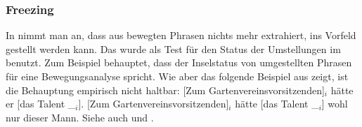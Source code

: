 \subsubsection{Freezing}

In \gb nimmt man an, dass aus bewegten Phrasen nichts mehr extrahiert, \dash \zb ins Vorfeld gestellt werden kann.
Das wurde als Test für den Status der Umstellungen im \mf benutzt. Zum Beispiel \citet{Diesing92a} behauptet,
dass der Inselstatus von umgestellten Phrasen für eine Bewegungsanalyse spricht. Wie aber
das folgende Beispiel aus  zeigt, ist die Behauptung empirisch nicht haltbar:
\eal
\ex {}[Zum Gartenvereinsvorsitzenden]$_i$ hätte er [das Talent \_$_i$].
\ex {}[Zum Gartenvereinsvorsitzenden]$_i$ hätte [das Talent \_$_i$] wohl nur dieser Mann.\label{bsp-gartenvereinsvorsitzender}
\zl
Siehe auch  und .%





